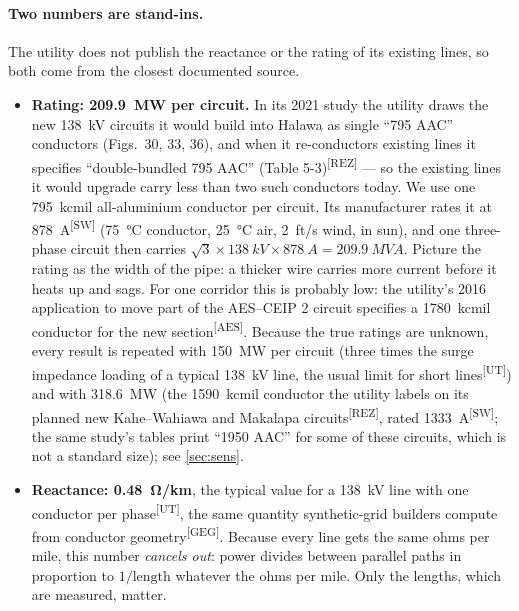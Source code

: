 \documentclass[11pt,a4paper]{article}
\newcommand{\src}[1]{\textsuperscript{[#1]}}
\begin{document}
\paragraph{Two numbers are stand-ins.} The utility does not publish the reactance or
the rating of its existing lines, so both come from the closest documented source.
\begin{itemize}
  \item \textbf{Rating: \SI{209.9}{MW} per circuit.} In its 2021 study the utility draws
        the new \SI{138}{kV} circuits it would build into Halawa as single ``795 AAC''
        conductors (Figs.~30, 33, 36), and when it re-conductors existing lines it
        specifies ``double-bundled 795 AAC'' (Table 5-3)\src{REZ} --- so the existing
        lines it would upgrade carry less than two such conductors today. We use one
        \SI{795}{kcmil} all-aluminium conductor per circuit. Its manufacturer rates it
        at \SI{878}{A}\src{SW} (\SI{75}{\celsius} conductor, \SI{25}{\celsius} air,
        \SI{2}{ft/s} wind, in sun), and one three-phase circuit then carries
        $\sqrt{3}\times\SI{138}{kV}\times\SI{878}{A} = \SI{209.9}{MVA}$. Picture the rating
        as the width of the pipe: a thicker wire carries more current before it heats
        up and sags. For one corridor this is probably low: the utility's 2016
        application to move part of the AES--CEIP 2 circuit specifies a
        \SI{1780}{kcmil} conductor for the new section\src{AES}. Because the true
        ratings are unknown, every result is repeated with \SI{150}{MW} per circuit
        (three times the surge impedance loading of a typical \SI{138}{kV} line, the
        usual limit for short lines\src{UT}) and with \SI{318.6}{MW} (the
        \SI{1590}{kcmil} conductor the utility labels on its planned new Kahe--Wahiawa
        and Makalapa circuits\src{REZ}, rated \SI{1333}{A}\src{SW}; the same study's
        tables print ``1950 AAC'' for some of these circuits, which is not a standard
        size); see \cref{sec:sens}.
  \item \textbf{Reactance: \SI{0.48}{\ohm/km}}, the typical value for a
        \SI{138}{kV} line with one conductor per phase\src{UT}, the same quantity synthetic-grid
        builders compute from conductor geometry\src{GEG}. Because every line gets the
        same ohms per mile, this number \emph{cancels out}: power divides between
        parallel paths in proportion to $1/\text{length}$ whatever the ohms per mile.
        Only the lengths, which are measured, matter.
\end{itemize}
\end{document}
